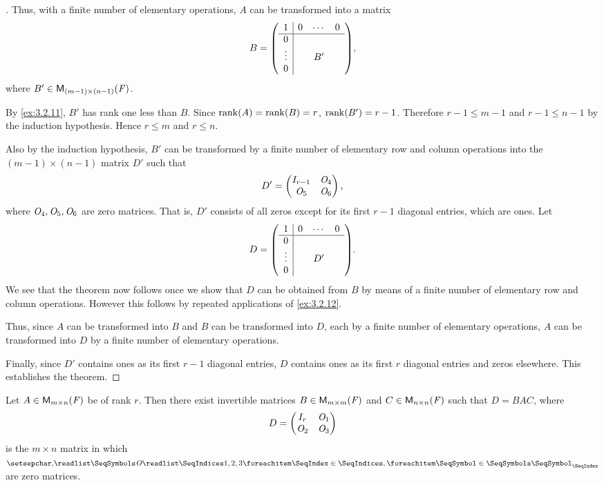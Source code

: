 \begin{proof}[]
	Thus, with a finite number of elementary operations, \(A\) can be transformed into a matrix
	\[
		B = \pa{\begin{array}{c|ccc}
				1      & 0 & \cdots & 0 \\
				\hline
				0      &   &        &   \\
				\vdots &   & B'     &   \\
				0      &   &        &
			\end{array}},
	\]
	where \(B' \in \ms[(m - 1)][(n - 1)][\F]\).

	By \cref{ex:3.2.11}, \(B'\) has rank one less than \(B\).
	Since \(\rk{A} = \rk{B} = r\), \(\rk{B'} = r - 1\).
	Therefore \(r - 1 \leq m - 1\) and \(r - 1 \leq n - 1\) by the induction hypothesis.
	Hence \(r \leq m\) and \(r \leq n\).

	Also by the induction hypothesis, \(B'\) can be transformed by a finite number of elementary row and column operations into the \((m-1) \times (n-1)\) matrix \(D'\) such that
	\[
		D' = \begin{pmatrix}
			I_{r - 1} & \mathit{O}_4 \\
			\mathit{O}_5     & \mathit{O}_6
		\end{pmatrix},
	\]
	where \(\mathit{O}_4, \mathit{O}_5, \mathit{O}_6\) are zero matrices.
	That is, \(D'\) consists of all zeros except for its first \(r - 1\) diagonal entries, which are ones.
	Let
	\[
		D = \pa{\begin{array}{c|ccc}
				1      & 0 & \cdots & 0 \\
				\hline
				0      &   &        &   \\
				\vdots &   & D'     &   \\
				0      &   &        &
			\end{array}}.
	\]
	We see that the theorem now follows once we show that \(D\) can be obtained from \(B\) by means of a finite number of elementary row and column operations.
	However this follows by repeated applications of \cref{ex:3.2.12}.

	Thus, since \(A\) can be transformed into \(B\) and \(B\) can be transformed into \(D\), each by a finite number of elementary operations, \(A\) can be transformed into \(D\) by a finite number of elementary operations.

	Finally, since \(D'\) contains ones as its first \(r - 1\) diagonal entries, \(D\) contains ones as its first \(r\) diagonal entries and zeros elsewhere.
	This establishes the theorem.
\end{proof}

\begin{cor}\label{3.2.4}
	Let \(A \in \MS\) be of rank \(r\).
	Then there exist invertible matrices \(B \in \ms[m][m][\F]\) and \(C \in \ms[n][n][\F]\) such that \(D = BAC\), where
	\[
		D = \begin{pmatrix}
			I_r   & \mathit{O}_1 \\
			\mathit{O}_2 & \mathit{O}_3
		\end{pmatrix}
	\]
	is the \(m \times n\) matrix in which \(\seq{\zm}{1,2,3}\) are zero matrices.
\end{cor}

